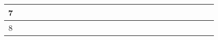\begin{table}[h]
\begin{tabular}{|c|cccccccccccc|cccccccccccc|}
		7                        & \multicolumn{1}{c|}{} & \multicolumn{1}{c|}{}                         & \multicolumn{1}{c|}{}                         & \multicolumn{1}{c|}{}                         & \multicolumn{1}{c|}{}                         & \multicolumn{1}{c|}{}                         & \multicolumn{1}{c|}{}                         & \multicolumn{1}{c|}{}                         & \multicolumn{1}{c|}{}                         & \multicolumn{1}{c|}{}                         & \multicolumn{1}{c|}{}                         &                          & \multicolumn{1}{c|}{}                         & \multicolumn{1}{c|}{}                         & \multicolumn{1}{c|}{}                         & \multicolumn{1}{c|}{}                         & \multicolumn{1}{c|}{}                         & \multicolumn{1}{c|}{}                         & \multicolumn{1}{c|}{\cellcolor[HTML]{343434}} & \multicolumn{1}{c|}{\cellcolor[HTML]{343434}} & \multicolumn{1}{c|}{\cellcolor[HTML]{343434}} & \multicolumn{1}{c|}{}                         & \multicolumn{1}{c|}{}                         &  \\ \hline
		8                        & \multicolumn{1}{c|}{} & \multicolumn{1}{c|}{}                         & \multicolumn{1}{c|}{}                         & \multicolumn{1}{c|}{}                         & \multicolumn{1}{c|}{}                         & \multicolumn{1}{c|}{}                         & \multicolumn{1}{c|}{}                         & \multicolumn{1}{c|}{}                         & \multicolumn{1}{c|}{}                         & \multicolumn{1}{c|}{}                         & \multicolumn{1}{c|}{}                         &                          & \multicolumn{1}{c|}{}                         & \multicolumn{1}{c|}{}                         & \multicolumn{1}{c|}{}                         & \multicolumn{1}{c|}{}                         & \multicolumn{1}{c|}{}                         & \multicolumn{1}{c|}{}                         & \multicolumn{1}{c|}{}                         & \multicolumn{1}{c|}{\cellcolor[HTML]{343434}} & \multicolumn{1}{c|}{\cellcolor[HTML]{343434}} & \multicolumn{1}{c|}{\cellcolor[HTML]{343434}} & \multicolumn{1}{c|}{}                         &  \\ \hline

\end{tabular}
\end{table}
